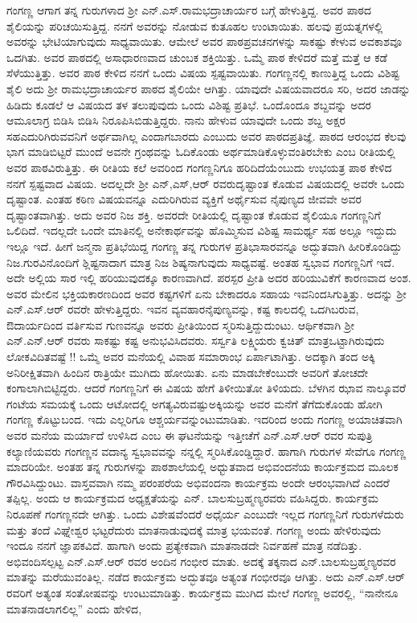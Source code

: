 {ಗಂಗಣ್ಣ ಆಗಾಗ ತನ್ನ ಗುರುಗಳಾದ ಶ್ರೀ ಎನ್.ಎಸ್.ರಾಮಭದ್ರಾಚಾರ್ಯರ ಬಗ್ಗೆ ಹೇಳುತ್ತಿದ್ದ. ಅವರ ಪಾಠದ ಶೈಲಿಯನ್ನು ಪರಿಚಯಿಸುತ್ತಿದ್ದ. ನನಗೆ ಅವರನ್ನು ನೋಡುವ ಕುತೂಹಲ ಉಂಟಾಯಿತು. ಹಲವು ಪ್ರಯತ್ನಗಳಲ್ಲಿ ಅವರನ್ನು  ಭೇಟಿಯಾಗುವುದು ಸಾಧ್ಯವಾಯಿತು. ಆಮೇಲೆ ಅವರ ಪಾಠಪ್ರವಚನಗಳನ್ನು ಸಾಕಷ್ಟು ಕೇಳುವ ಅವಕಾಶವೂ ಒದಗಿತು. ಅವರ ಪಾಠದಲ್ಲಿ ಅಸಾಧಾರಣವಾದ ಚುಂಬಕ ಶಕ್ತಿಯಿತ್ತು. ಒಮ್ಮೆ ಪಾಠ ಕೇಳಿದರೆ ಮತ್ತೆ ಮತ್ತೆ ಆ ಕಡೆ ಸೆಳೆಯುತ್ತಿತ್ತು. ಅವರ ಪಾಠ ಕೇಳಿದ ನನಗೆ ಒಂದು ವಿಷಯ ಸ್ಪಷ್ಟವಾಯಿತು. ಗಂಗಣ್ಣನಲ್ಲಿ ಕಾಣುತ್ತಿದ್ದ ಒಂದು ವಿಶಿಷ್ಟ ಶೈಲಿ ಅದು ಶ್ರೀ ರಾಮಭದ್ರಾಚಾರ್ಯರ ಪಾಠದ ಶೈಲಿಯೇ ಆಗಿತ್ತು. ಯಾವುದೇ ವಿಷಯ\-ವಾದರೂ ಸರಿ, ಅದರ ಜಾಡನ್ನು ಹಿಡಿದು ಕೂಡಲೆ ಆ ವಿಷಯದ ತಳ ತಲುಪು\-ವುದು ಒಂದು ವಿಶಿಷ್ಟ ಪ್ರತಿಭೆ. ಒಂದೊಂದೂ ಶಬ್ದವನ್ನು ಅದರ ಆಮೂಲಾಗ್ರ ಬಿಡಿಸಿ ಬಿಡಿಸಿ ನಿರೂಪಿಸಿಬಿಡುತ್ತಿದ್ದರು. ನಾನು ಹೇಳುವ ಯಾವುದೇ ಒಂದು ಶಬ್ದ ಅಕ್ಷರ ಸಹ\break ಎದುರಿಗಿರುವವನಿಗೆ ಅರ್ಥವಾಗಿಲ್ಲ ಎಂದಾಗಬಾರದು ಎಂಬುದು ಅವರ ಪಾಠದ\break ಪ್ರತಿಜ್ಞೆ. ಪಾಠದ ಆರಂಭದ ಕೆಲವು ಭಾಗ ಮಾಡಿಬಿಟ್ಟರೆ ಮುಂದೆ ಅವನೇ ಗ್ರಂಥವನ್ನು ಓದಿಕೊಂಡು ಅರ್ಥಮಾಡಿಕೊಳ್ಳುವಂತಿರಬೇಕು ಎಂಬ ರೀತಿಯಲ್ಲಿ ಅವರ ಪಾಠವಿರುತ್ತಿತ್ತು. ಈ ರೀತಿಯ ಕಲೆ ಅವರಿಂದ ಗಂಗಣ್ಣನಿಗೂ ಹರಿದಿದೆಯೆಂಬುದು ಉಭಯತ್ರ ಪಾಠ ಕೇಳಿದ ನನಗೆ ಸ್ಪಷ್ಟವಾದ ವಿಷಯ. ಅದಲ್ಲದೇ ಶ್ರೀ ಎನ್,ಎಸ್,ಆರ್ ರವರು\break ದೃಷ್ಟಾಂತ ಕೊಡುವ ವಿಷಯದಲ್ಲಿ ಅವರೇ ಒಂದು ದೃಷ್ಟಾಂತ. ಎಂತಹ ಕಠಿಣ ವಿಷಯ\-ವನ್ನೂ ಎದುರಿಗಿರುವ ವ್ಯಕ್ತಿಗೆ ಅರ್ಥೈಸುವ ನೈಪುಣ್ಯದ ಜೀವವೇ ಅವರ ದೃಷ್ಟಾಂತ\-ವಾಗಿತ್ತು. ಅದು ಅವರ ನಿಜ ಶಕ್ತಿ. ಅವರದೇ ರೀತಿಯಲ್ಲಿ ದೃಷ್ಟಾಂತ ಕೊಡುವ ಶೈಲಿಯೂ ಗಂಗಣ್ಣನಿಗೆ ಒಲಿದಿದೆ. ಇದಲ್ಲದೇ ಒಂದೇ ಮಾತಿನಲ್ಲಿ ಅನೇಕಾರ್ಥವನ್ನು ಹೊಮ್ಮಿಸುವ ವಿಶಿಷ್ಟ ಸಾಮರ್ಥ್ಯ ಸಹ ಅಲ್ಲೂ ಇದ್ದುದು ಇಲ್ಲೂ ಇದೆ. ಹೀಗೆ ಜನ್ಮನಾ ಪ್ರತಿಭೆ\-ಯಿದ್ದ ಗಂಗಣ್ಣ ತನ್ನ ಗುರುಗಳ ಪ್ರತಿಭಾಸಾರವನ್ನೂ  ಅದ್ಭುತವಾಗಿ ಹೀರಿಕೊಂಡಿದ್ದು ನಿಜ.\break ಗುರವಿನೊಂದಿಗೆ ಶ್ಲಿಷ್ಟನಾದಾಗ ಮಾತ್ರ ನಿಜ ಶಿಷ್ಯನಾಗುವುದು ಸಾಧ್ಯವಷ್ಟೆ. ಅಂತಹ ಸ್ವಭಾವ ಗಂಗಣ್ಣನಿಗೆ ಇದೆ. ಅದೇ ಅಲ್ಲಿಯ ಸಾರ ಇಲ್ಲಿ ಹರಿಯುವುದಕ್ಕೂ ಕಾರಣ\-ವಾಗಿದೆ. ಪರಸ್ಪರ ಪ್ರೀತಿ ಅದರ ಹರಿಯುವಿಕೆಗೆ ಕಾರಣವಾದ ಅಂಶ. ಅವರ ಮೇಲಿನ ಭಕ್ತಿಯಕಾರಣದಿಂದ ಅವರ ಕಷ್ಟಗಳಿಗೆ ಏನು ಬೇಕಾದರೂ ಸಹಾಯ ಇವನಿಂದ\break ಸಿಗುತ್ತಿತ್ತು. ಅದನ್ನು ಶ್ರೀ ಎನ್.ಎಸ್.ಆರ್ ರವರೇ ಹೇಳುತ್ತಿದ್ದರು. ಇವನ ವ್ಯವಹಾರ\break ನೈಪುಣ್ಯವನ್ನು, ಕಷ್ಟ ಕಾಲದಲ್ಲಿ ಒದಗಿಬರುವ, ಔದಾರ್ಯದಿಂದ ವರ್ತಿಸುವ ಗುಣ\-ವನ್ನೂ ಅವರು ಪ್ರೀತಿಯಿಂದ ಸ್ಮರಿಸುತ್ತಿದ್ದುದುಂಟು. ಆರ್ಥಿಕವಾಗಿ ಶ್ರೀ ಎನ್.ಎನ್.ಆರ್ ರವರು ಸಾಕಷ್ಟು ಕಷ್ಟ ಅನುಭವಿಸಿದವರು. ಸರ್ಸ್ವತಿ ಲಕ್ಷ್ಮಿಯರು ಕ್ವಚಿತ್ ಮಾತ್ರ\break ಒಟ್ಟಾಗಿರುವುದು ಲೋಕವಿದಿತವಷ್ಟೆ !! ಒಮ್ಮೆ ಅವರ ಮನೆಯಲ್ಲಿ ವಿವಾಹ ಸಮಾರಾಂಭ ಏರ್ಪಾಟಾಗಿತ್ತು. ಅದಕ್ಕಾಗಿ ತಂದ ಅಕ್ಕಿ ಅನಿರೀಕ್ಷಿತವಾಗಿ ಹಿಂದಿನ ರಾತ್ರಿಯೇ ಮುಗಿದು ಹೋಯಿತು. ಏನು ಮಾಡಬೇಕೆಂಬುದೇ ಅವರಿಗೆ ತೋಚದೇ ಕಂಗಾಲಾಗಿಬಿಟ್ಟಿದ್ದರು. ಆದರೆ ಗಂಗಣ್ಣನಿಗೆ ಈ ವಿಷಯ ಹೇಗೆ ತಿಳೀಯಿತೋ ತಿಳಿಯದು. ಬೆಳಗಿನ ಝಾವ ನಾಲ್ಕೂವರೆ ಗಂಟೆಯ ಸಮಯಕ್ಕೆ ಒಂದು ಆಟೋದಲ್ಲಿ ಅಗತ್ಯವಿರುವಷ್ಟು\break ಅಕ್ಕಿಯನ್ನು ಅವರ ಮನೆಗೆ ತೆಗೆದುಕೊಂಡು ಹೋಗಿ ಗಂಗಣ್ಣ ಕೊಟ್ಟುಬಂದ. ಇದು ಎಲ್ಲರಿಗೂ ಆಶ್ಚರ್ಯವನ್ನುಂಟುಮಾಡಿತು. ಇದರಿಂದ ಅಂದು ಗಂಗಣ್ಣ ಅಯಾಚಿತ\-ವಾಗಿ ಅವರ ಮನೆಯ ಮರ್ಯಾದೆ ಉಳಿಸಿದ ಎಂಬ ಈ ಘಟನೆಯನ್ನು ಇತ್ತೀಚೆಗೆ ಎನ್.ಎಸ್.ಆರ್ ರವರ ಸುಪುತ್ರಿ ಕಲ್ಯಾಣಿಯವರು ಗಂಗಣ್ಣನ ವದಾನ್ಯ ಸ್ವಭಾವ\-ವನ್ನು ನನ್ನಲ್ಲಿ ಸ್ಮರಿಸಿಕೊಂಡ್ಡಿದ್ದಾರೆ. ಹಾಗಾಗಿ ಗುರುಗಳ ಸೇವೆಗೂ ಗಂಗಣ್ಣ ಮಾದರಿಯೇ. ಅಂತಹ ತನ್ನ ಗುರುಗಳನ್ನು ಪಾಠಶಾಲೆಯಲ್ಲಿ ಅಧ್ಭುತವಾದ ಅಭಿವಂದನೆಯ ಕಾರ್ಯಕ್ರಮದ ಮೂಲಕ ಗೌರವಿಸಿದ್ದುಂಟು. ವಾಸ್ತವವಾಗಿ ನಮ್ಮ ಪರಂಪರೆಯ ಅಭಿವಂದನಾ ಕಾರ್ಯಕ್ರಮ ಅಂದೇ ಆರಂಭವಾಗಿದೆ ಎಂದರೆ ತಪ್ಪಿಲ್ಲ. ಅಂದು ಆ ಕಾರ್ಯಕ್ರಮದ ಅಧ್ಯಕ್ಷತೆಯನ್ನು ಎನ್. ಬಾಲಸುಬ್ರಹ್ಮಣ್ಯರವರು ವಹಿಸಿದ್ದರು. ಕಾರ್ಯಕ್ರಮ ನಿರೂಪಣೆ ಗಂಗಣ್ಣನದೇ ಆಗಿತ್ತು. ಒಂದು ವಿಶೇಷವೆಂದರೆ ಅಧೈರ್ಯ ಎಂಬುದೇ ಇಲ್ಲದ ಗಂಗಣ್ಣನಿಗೆ ಗುರುಗಳೆದುರು ಮತ್ತು ತಂದೆ ವಿಘ್ನೇಶ್ವರ ಭಟ್ಟರೆದುರು ಮಾತನಾಡುವುದಕ್ಕೆ ಮಾತ್ರ ಭಯವಂತೆ. ಗಂಗಣ್ಣ ಅಂದು ಹೇಳಿರುವುದು ಇಂದೂ ನನಗೆ ಜ್ಞಾಪಕವಿದೆ. ಹಾಗಾಗಿ ಅಂದು ಪ್ರತ್ಯೇಕವಾಗಿ ಮಾತನಾಡದೇ ನಿರ್ವಹಣೆ ಮಾತ್ರ ನಡೆದಿತ್ತು. ಅಭಿವಂದಿಸಲ್ಪಟ್ಟ ಎನ್.ಎಸ್.ಆರ್ ರವರ ಅಂದಿನ ಗಂಭೀರ ಮಾತು. ಅದಕ್ಕೆ ತಕ್ಕನಾದ ಎನ್.ಬಾಲಸುಬ್ರಹ್ಮಣ್ಯರವರ ಮಾತನ್ನು ಮರೆಯುವಂತಿಲ್ಲ. ನಡೆದ ಕಾರ್ಯಕ್ರಮ ಅದ್ಭುತವೂ ಅತ್ಯಂತ ಗಂಭೀರವೂ ಆಗಿತ್ತು. ಅದು ಎನ್.ಎಸ್.ಆರ್ ರವರಿಗೆ ಅತ್ಯಂತ ಸಂತೋಷವನ್ನು ಉಂಟುಮಾಡಿತ್ತು. ಕಾರ್ಯಕ್ರಮ ಮುಗಿದ ಮೇಲೆ ಗಂಗಣ್ಣ ಅವರಲ್ಲಿ, “ನಾನೇನೂ ಮಾತನಾಡಲಾಗಲಿಲ್ಲ” ಎಂದು ಹೇಳಿದ, }
